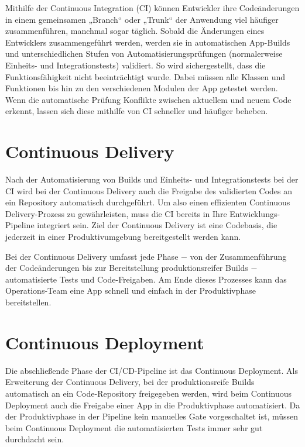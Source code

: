 Mithilfe der Continuous Integration (CI) können Entwickler ihre Codeänderungen in einem gemeinsamen „Branch“ oder „Trunk“ der Anwendung viel häufiger zusammenführen, manchmal sogar täglich. Sobald die Änderungen eines Entwicklers zusammengeführt werden, werden sie in automatischen App-Builds und unterschiedlichen Stufen von Automatisierungsprüfungen (normalerweise Einheits- und Integrationstests) validiert. So wird sichergestellt, dass die Funktionsfähigkeit nicht beeinträchtigt wurde. Dabei müssen alle Klassen und Funktionen bis hin zu den verschiedenen Modulen der App getestet werden. Wenn die automatische Prüfung Konflikte zwischen aktuellem und neuem Code erkennt, lassen sich diese mithilfe von CI schneller und häufiger beheben.\autocite{whatIsCICD}

\section{Continuous Delivery}

Nach der Automatisierung von Builds und Einheits- und Integrationstests bei der CI wird bei der Continuous Delivery auch die Freigabe des validierten Codes an ein Repository automatisch durchgeführt. Um also einen effizienten Continuous Delivery-Prozess zu gewährleisten, muss die CI bereits in Ihre Entwicklungs-Pipeline integriert sein. Ziel der Continuous Delivery ist eine Codebasis, die jederzeit in einer Produktivumgebung bereitgestellt werden kann.\autocite{whatIsCICD}

Bei der Continuous Delivery umfasst jede Phase − von der Zusammenführung der Codeänderungen bis zur Bereitstellung produktionsreifer Builds − automatisierte Tests und Code-Freigaben. Am Ende dieses Prozesses kann das Operations-Team eine App schnell und einfach in der Produktivphase bereitstellen.\autocite{whatIsCICD}

\section{Continuous Deployment}

Die abschließende Phase der CI/CD-Pipeline ist das Continuous Deployment. Als Erweiterung der Continuous Delivery, bei der produktionsreife Builds automatisch an ein Code-Repository freigegeben werden, wird beim Continuous Deployment auch die Freigabe einer App in die Produktivphase automatisiert. Da der Produktivphase in der Pipeline kein manuelles Gate vorgeschaltet ist, müssen beim Continuous Deployment die automatisierten Tests immer sehr gut durchdacht sein.\autocite{whatIsCICD}

